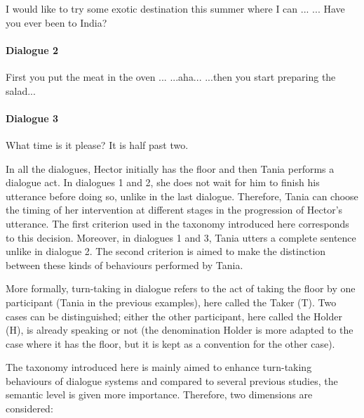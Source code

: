         \begin{dialogue}
           I would like to try some exotic destination this summer where I can ...
           ... Have you ever been to India?
        \end{dialogue}

        \paragraph{Dialogue 2}

        \begin{dialogue}
           First you put the meat in the oven ...
           ...aha...
           ...then you start preparing the salad...
        \end{dialogue}

        \paragraph{Dialogue 3}

        \begin{dialogue}
           What time is it please?
           It is half past two.
        \end{dialogue}

        In all the dialogues, Hector initially has the floor and then Tania performs a dialogue act. In dialogues 1 and 2, she does not wait for him to finish his utterance before doing so, unlike in the last dialogue. Therefore, Tania can choose the timing of her intervention at different stages in the progression of Hector's utterance. The first criterion used in the taxonomy introduced here corresponds to this decision. Moreover, in dialogues 1 and 3, Tania utters a complete sentence unlike in dialogue 2. The second criterion is aimed to make the distinction between these kinds of behaviours performed by Tania.

	More formally, turn-taking in dialogue refers to the act of taking the floor by one participant (Tania in the previous examples), here called the Taker (T). Two cases can be distinguished; either the other participant, here called the Holder (H), is already speaking or not (the denomination Holder is more adapted to the case where it has the floor, but it is kept as a convention for the other case).
    
    The taxonomy introduced here is mainly aimed to enhance turn-taking behaviours of dialogue systems and compared to several previous studies, the semantic level is given more importance. Therefore, two dimensions are considered:

